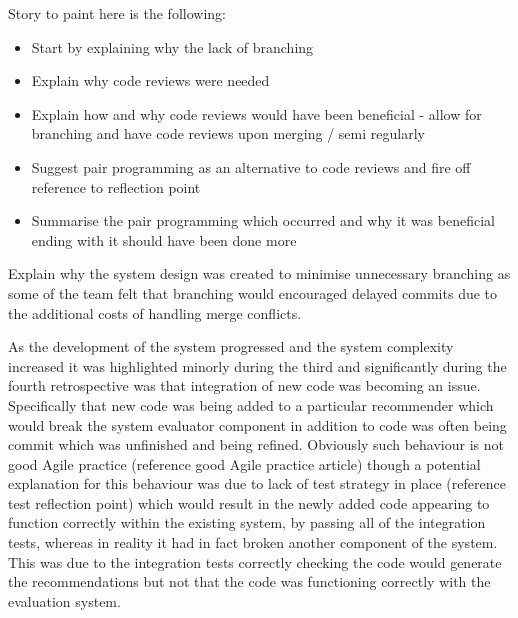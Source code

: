 \documentclass{l3proj}
\begin{document}


Story to paint here is the following:
\begin{itemize}
\item Start by explaining why the lack of branching
\item Explain why code reviews were needed
\item Explain how and why code reviews would have been beneficial - allow for branching and have code reviews upon merging / semi regularly
\item Suggest pair programming as an alternative to code reviews and fire off reference to reflection point
\item Summarise the pair programming which occurred and why it was beneficial ending with it should have been done more
\end{itemize}

Explain why the system design was created to minimise unnecessary branching as some of the team felt that branching would encouraged delayed commits due to the additional costs of handling merge conflicts.

As the development of the system progressed and the system complexity increased it was highlighted minorly during the third and significantly during the fourth retrospective was that integration of new code was becoming an issue. Specifically that new code was being added to a particular recommender which would break the system evaluator component in addition to code was often being commit which was unfinished and being refined. Obviously such behaviour is not good Agile practice (reference good Agile practice article) though a potential explanation for this behaviour was due to lack of test strategy in place (reference test reflection point) which would result in the newly added code appearing to function correctly within the existing system, by passing all of the integration tests, whereas in reality it had in fact broken another component of the system. This was due to the integration tests correctly checking the code would generate the recommendations but not that the code was functioning correctly with the evaluation system.
\end{document}
